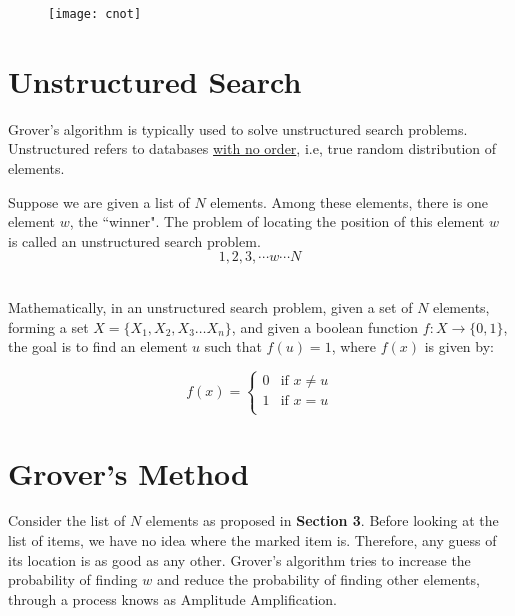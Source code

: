\documentclass[a4paper]{article}
\begin{document}
\begin{figure}[h]
\texttt{[image: cnot]}
\centering
\end{figure}

\pagebreak


\section{ Unstructured Search }

Grover's algorithm is typically used to solve unstructured search problems.
Unstructured refers to databases \underline{with no order}, i.e, true random
distribution of elements. 
\\
\par

Suppose we are given a list of $N$ elements. Among these elements, there is one
element $w$, the ``winner". The problem of locating the position of this element
$w$ is called an unstructured search problem.  $$ 1, 2, 3, \cdots w \cdots N $$
\\ \par

Mathematically, in an unstructured search problem, given a set of $N$ elements,
forming a set $X = \{X_1, X_2, X_3 \ldots X_n\} $, and given a boolean function
$f: X \to \{0, 1\}$, the goal is to find an element $u$ such that $f(u) = 1$,
where $f(x)$ is given by:

\[
    f(x) = \left\{
        \begin{array}{ll}
            0 & \mbox{if } x \neq u \\
            1 & \mbox{if } x = u \\
        \end{array}
        \right.
\]

\pagebreak


\section{ Grover's Method }
Consider the list of $N$ elements as proposed in \textbf{Section 3}. Before
looking at the list of items, we have no idea where the marked item is.
Therefore, any guess of its location is as good as any other. Grover's algorithm
tries to increase the probability of finding $w$ and reduce the probability of 
finding other elements, through a process knows as Amplitude Amplification.
\\
\par
\end{document}
